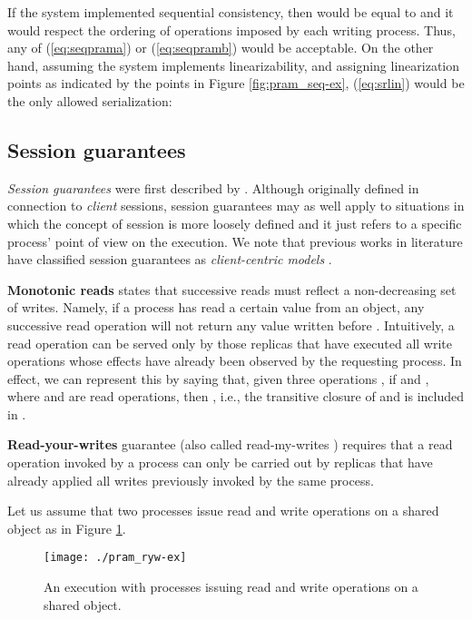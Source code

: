 \documentclass[letter, 11pt]{article}
\newcommand{\citeN}{\citet}
\renewcommand{\cite}{\citep}
\begin{document}
If the system implemented sequential consistency, then  would be equal to  and 
it would respect the ordering of operations imposed by each writing process.
Thus, any of (\ref{eq:seqprama}) or (\ref{eq:seqpramb}) would be acceptable.
On the other hand, assuming the system implements linearizability, and assigning linearization points as indicated by the points  
in Figure \ref{fig:pram_seq-ex}, (\ref{eq:srlin}) would be the only allowed serialization:




\subsection{Session guarantees} 
\label{subsec:session}
\emph{Session guarantees} were first described by \citeN{Terry.Demers.ea:94}.
Although originally defined in connection to \emph{client} sessions, session guarantees may as well apply to situations in which the concept of session
is more loosely defined and it just refers to a specific process' point of view on the execution. 
We note that previous works in literature have classified session guarantees as \emph{client-centric models} \cite{Tanenbaum.Steen:07}. 

\textbf{Monotonic reads} states that successive reads must reflect a non-decreasing set of writes. 
Namely, if a process has read a certain value  from an object, any successive read operation will not return any value written before .
Intuitively, a read operation can be served only by those replicas that have executed all write operations whose effects have already been observed by the requesting process.
In effect, we can represent this by saying that, given three operations , if 
and , where  and  are read operations, then , i.e., the transitive
closure of  and  is included in .


\textbf{Read-your-writes} guarantee (also called read-my-writes \cite{Terry.Prabhakaran.ea:13,Burckhardt:14})
requires that a read operation invoked by a process can only be carried out by replicas 
that have already applied all writes previously invoked by the same process.


Let us assume that two processes issue read and write operations on a shared object as in Figure \ref{fig:pram_ryw-ex}.
\begin{figure}[h]
	\centering
	\texttt{[image: ./pram\_ryw-ex]} 	\caption{An execution with processes issuing read and write operations on a shared object.}
	\label{fig:pram_ryw-ex}
\end{figure}
\end{document}
